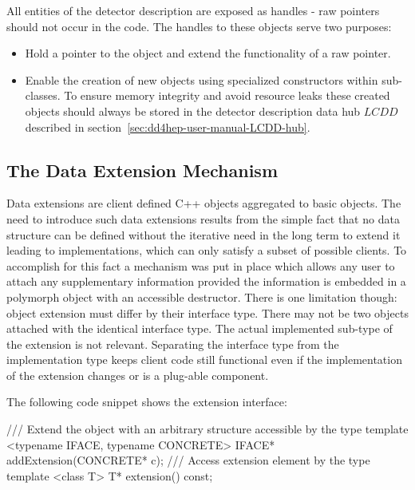 \documentclass[10pt,a4paper]{article}
\begin{document}
\noindent
All entities of the \DDhep detector description are exposed as handles - 
raw pointers should not occur in the code. 
The handles to these objects serve two purposes:
\begin{itemize}\itemcompact
\item Hold a pointer to the object and extend the functionality of a raw
    pointer.
\item Enable the creation of new objects using specialized constructors
    within sub-classes. To ensure memory integrity and avoid resource 
    leaks these created objects should always be stored in the 
    detector description data hub $LCDD$ described in 
    section~\ref{sec:dd4hep-user-manual-LCDD-hub}.
\end{itemize}

\newpage
\subsection{The Data Extension Mechanism}
\label{sec:dd4hep-user-manual-data-extensions}
\noindent
Data extensions are client defined C++ objects aggregated to basic \DDhep objects.
The need to introduce such data extensions results from the simple fact that
no data structure can be defined without the iterative need in the long term
to extend it leading to implementations, which can only satisfy a subset of 
possible clients. To accomplish for this fact a mechanism was put in place
which allows any user to attach any supplementary information provided
the information is embedded in a polymorph object with an accessible destructor.
There is one limitation though: object extension must differ by their 
interface type. 
There may not be two objects attached with the identical interface type.
The actual implemented sub-type of the extension is not relevant.
Separating the interface type from the implementation type keeps client
code still functional even if the implementation of the extension changes 
or is a plug-able component.

\noindent
The following code snippet shows the extension interface:

\begin{code}
  /// Extend the object with an arbitrary structure accessible by the type
  template <typename IFACE, typename CONCRETE> IFACE* addExtension(CONCRETE* c);
  /// Access extension element by the type
  template <class T> T* extension() const;
\end{code}
\end{document}
